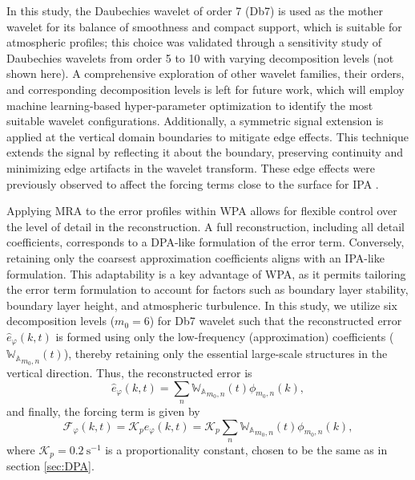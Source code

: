 In this study, the Daubechies wavelet \citep{Daubechies1992} of order 7 (Db7) is used as the mother wavelet for its balance of smoothness and compact support, which is suitable for atmospheric profiles; this choice was validated through a sensitivity study of Daubechies wavelets from order 5 to 10 with varying decomposition levels (not shown here). A comprehensive exploration of other wavelet families, their orders, and corresponding decomposition levels is left for future work, which will employ machine learning-based hyper-parameter optimization to identify the most suitable wavelet configurations. Additionally, a symmetric signal extension is applied at the vertical domain boundaries to mitigate edge effects. This technique extends the signal by reflecting it about the boundary, preserving continuity and minimizing edge artifacts in the wavelet transform. These edge effects were previously observed to affect the forcing terms close to the surface for IPA \citep{allaerts2020development}.  

Applying MRA to the error profiles within WPA allows for flexible control over the level of detail in the reconstruction. A full reconstruction, including all detail coefficients, corresponds to a DPA-like formulation of the error term. Conversely, retaining only the coarsest approximation coefficients aligns with an IPA-like formulation. This adaptability is a key advantage of WPA, as it permits tailoring the error term formulation to account for factors such as boundary layer stability, boundary layer height, and atmospheric turbulence. In this study, we utilize six decomposition levels (\( m_0 = 6 \)) for Db7 wavelet such that the reconstructed error \( \hat{e}_{\varphi}(k,t) \) is formed using only the low-frequency (approximation) coefficients (\( \mathbb{W_A}_{m_0,n}(t) \)), thereby retaining only the essential large-scale structures in the vertical direction. Thus, the reconstructed error is
\begin{equation}
\hat{e}_{\varphi}(k,t) = \sum_n \mathbb{W_A}_{m_0,n}(t) \phi_{m_0,n}(k),
\end{equation}
and finally, the forcing term is given by
\begin{equation}
\mathcal{F}_{\varphi}(k,t) = \mathcal{K}_{p} \hat{e}_{\varphi}(k,t) = \mathcal{K}_{p} \sum_n \mathbb{W_A}_{m_0,n}(t) \phi_{m_0,n}(k),
\label{wpaForcing}
\end{equation}
where $\mathcal{K}_p = 0.2~\mathrm{s^{-1}}$ is a proportionality constant, chosen to be the same as in section \ref{sec:DPA}.
